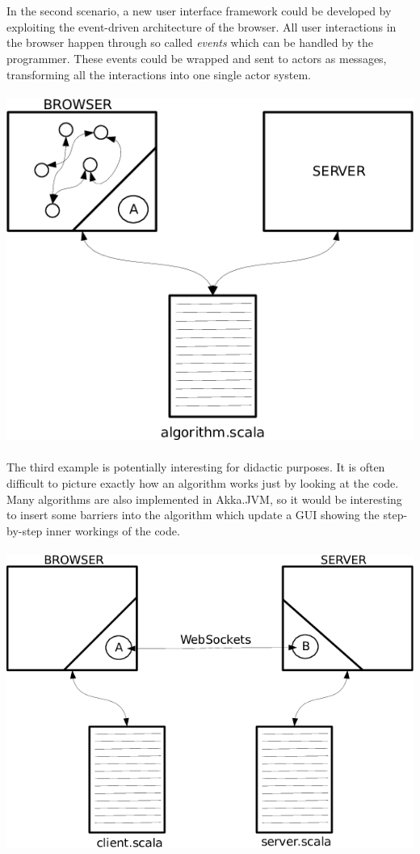 \documentclass{sig-alternate}
\begin{document}
\\\\
In the second scenario, a new user interface framework could be developed by exploiting the event-driven
architecture of the browser. All user interactions in the browser happen through so called \emph{events}
which can be handled by the programmer. These events could be wrapped and sent to actors as messages,
transforming all the interactions into one single actor system.
\\\\
\includegraphics[scale=0.5]{3.png}
\\\\
The third example is potentially interesting for didactic purposes. It is often difficult to picture 
exactly how an algorithm works just by looking at the code. Many algorithms are also implemented
in Akka.JVM, so it would be interesting to insert some barriers into the algorithm which update a 
GUI showing the step-by-step inner workings of the code.
\\\\
\includegraphics[scale=0.5]{4.png}
\end{document}
